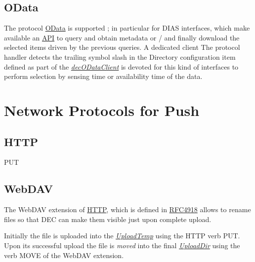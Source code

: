 \documentclass[dec_sum_main.tex]{subfiles}
\begin{document}
\subsection{OData}
The protocol \href{https://docs.oasis-open.org/odata/odata/v4.01/odata-v4.01-part1-protocol.html}{OData} is supported ; in particular for DIAS interfaces, which make available an \href{https://scihub.copernicus.eu/userguide/ODataAPI}{API} to query and obtain metadata or / and finally download the selected items driven by the previous queries.
A dedicated client The protocol handler detects the trailing symbol slash in the Directory configuration item defined as part of the \hyperref[decODataClient]{\textit{decODataClient}} is devoted for this kind of interfaces to perform selection by sensing time or availability time of the data.

\section{Network Protocols for Push}

\subsection{HTTP}
PUT

\subsection{WebDAV}
The WebDAV extension of \href{https://www.w3.org/Protocols/rfc2616/rfc2616-sec9.html}{HTTP}, which is defined in \href{https://tools.ietf.org/html/rfc4918}{RFC4918} allows to rename files so that DEC can make them visible just upon complete upload.

\par
\noindent
Initially the file is uploaded into the \hyperref[UploadTemp]{\textit{UploadTemp}} using the HTTP verb PUT. Upon its successful upload the file is \textit{moved} into the final \hyperref[UploadDir]{\textit{UploadDir}} using the verb MOVE of the WebDAV extension.
\end{document}
